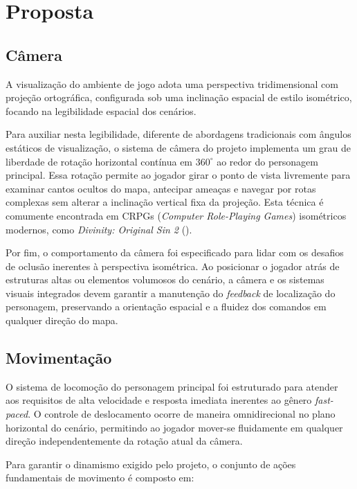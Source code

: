 
\chapter{Proposta}
\label{cap:proposta}


\section{Câmera}
\label{sec:camera}

A visualização do ambiente de jogo adota uma perspectiva tridimensional com
projeção ortográfica, configurada sob uma inclinação espacial de estilo
isométrico, focando na legibilidade espacial dos cenários.

Para auxiliar nesta legibilidade, diferente de abordagens tradicionais com ângulos estáticos de visualização,
o sistema de câmera do projeto implementa um grau de liberdade de rotação
horizontal contínua em $360^\circ$ ao redor do personagem principal. Essa rotação
permite ao jogador girar o ponto de vista livremente para examinar cantos
ocultos do mapa, antecipar ameaças e navegar por rotas complexas sem
alterar a inclinação vertical fixa da projeção. Esta técnica é comumente
encontrada em CRPGs (\textit{Computer Role-Playing Games}) isométricos modernos, como \textit{Divinity: Original Sin 2} (\cite{original-sin}).

Por fim, o comportamento da câmera foi especificado para lidar com os
desafios de oclusão inerentes à perspectiva isométrica. Ao posicionar o
jogador atrás de estruturas altas ou elementos volumosos do cenário, a
câmera e os sistemas visuais integrados devem garantir a manutenção do
\textit{feedback} de localização do personagem, preservando a orientação espacial e
a fluidez dos comandos em qualquer direção do mapa.

\section{Movimentação}
\label{sec:movimentacao}

O sistema de locomoção do personagem principal foi estruturado para
atender aos requisitos de alta velocidade e resposta imediata inerentes ao
gênero \textit{fast-paced}. O controle de deslocamento ocorre de maneira
omnidirecional no plano horizontal do cenário, permitindo ao jogador mover-se
fluidamente em qualquer direção independentemente da rotação atual da
câmera.

Para garantir o dinamismo exigido pelo projeto, o conjunto de ações
fundamentais de movimento é composto em:

